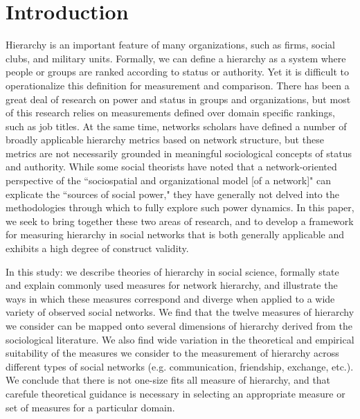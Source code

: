 \documentclass[3p,times]{elsarticle}
\begin{document}


\section{Introduction}
\label{sec:introduction}

Hierarchy is an important feature of many organizations, such as firms, social clubs, and military units. Formally, we can define a hierarchy as a system where people or groups are ranked according to status or authority. Yet it is difficult to operationalize this definition for measurement and comparison. There has been a great deal of research on power and status in groups and organizations, but most of this research relies on measurements defined over domain specific rankings, such as job titles. At the same time, networks scholars have defined a number of broadly applicable hierarchy metrics based on network structure, but these metrics are not necessarily grounded in meaningful sociological concepts of status and authority. While some social theorists have noted that a network-oriented perspective of the ``sociospatial and organizational model [of a network]" can explicate the ``sources of social power," \cite{mann1986sources} they have generally not delved into the methodologies through which to fully explore such power dynamics. In this paper, we seek to bring together these two areas of research, and to develop a framework for measuring hierarchy in social networks that is both generally applicable and exhibits a high degree of construct validity.

In this study: we describe theories of hierarchy in social science, formally state and explain commonly used measures for network hierarchy, and illustrate the ways in which these measures correspond and diverge when applied to a wide variety of observed social networks. We find that the twelve measures of hierarchy we consider can be mapped onto several dimensions of hierarchy derived from the sociological literature. We also find wide variation in the theoretical and empirical suitability of the measures we consider to the measurement of hierarchy across different types of social networks (e.g. communication, friendship, exchange, etc.). We conclude that there is not one-size fits all measure of hierarchy, and that carefule theoretical guidance is necessary in selecting an appropriate measure or set of measures for a particular domain.

\end{document}
